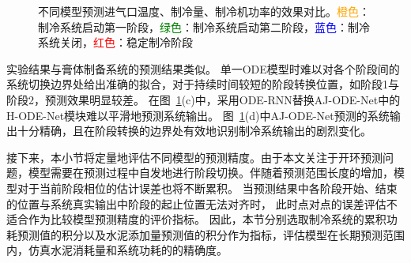 \begin{figure}
    \caption{不同模型预测进气口温度、制冷量、制冷机功率的效果对比。\textcolor{orange}{橙色}：制冷系统启动第一阶段，\textcolor{green}{绿色}：制冷系统启动第二阶段，\textcolor{blue}{蓝色}：制冷系统关闭，\textcolor{red}{红色}：稳定制冷阶段} %
    \label{fig:4_models}  %
    \end{figure}
实验结果与膏体制备系统的预测结果类似。
单一ODE模型时难以对各个阶段间的系统切换边界处给出准确的拟合，对于持续时间较短的阶段转换位置，如阶段1与阶段2，预测效果明显较差。
在图~\ref{fig:4_models}(c)中，采用ODE-RNN替换AJ-ODE-Net中的H-ODE-Net模块难以平滑地预测系统输出。
图~\ref{fig:4_models}(d)中AJ-ODE-Net预测的系统输出十分精确，且在阶段转换的边界处有效地识别制冷系统输出的剧烈变化。

接下来，本小节将定量地评估不同模型的预测精度。由于本文关注于开环预测问题，模型需要在预测过程中自发地进行阶段切换。伴随着预测范围长度的增加，模型对于当前阶段相位的估计误差也将不断累积。
当预测结果中各阶段开始、结束的位置与系统真实输出中阶段的起止位置无法对齐时，
此时点对点的误差评估不适合作为比较模型预测精度的评价指标。
因此，本节分别选取制冷系统的累积功耗预测值的积分以及水泥添加量预测值的积分作为指标，评估模型在长期预测范围内，仿真水泥消耗量和系统功耗的的精确度。

